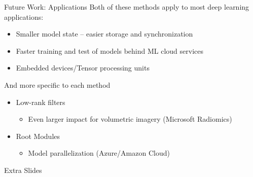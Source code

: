 \documentclass[t,xcolor=dvipsnames]{beamer}
\begin{document}
\begin{frame}{Future Work: Applications}
    Both of these methods apply to most deep learning applications:
    \begin{itemize}
        \item Smaller model state -- easier storage and synchronization
        \item Faster training and test of models behind ML cloud services
        \item Embedded devices/Tensor processing units
    \end{itemize}
    And more specific to each method
    \begin{itemize}
        \item Low-rank filters
        \begin{itemize}
            \item Even larger impact for volumetric imagery (Microsoft Radiomics)
        \end{itemize}
        \item Root Modules
        \begin{itemize}
            \item Model parallelization (Azure/Amazon Cloud)
        \end{itemize}
    \end{itemize}
\end{frame}




  \begin{frame}
  \vfill
  \centering
    Extra Slides\par%
  \vfill
  \end{frame}
  
  \usebackgroundtemplate{}

\end{document}
